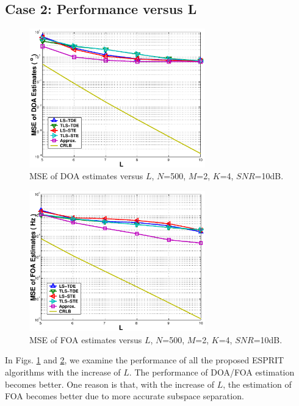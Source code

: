 \documentclass[a4paper,10pt,fleqn,twocolumn]{IEEEtran}
\begin{document}
\subsection*{Case 2: Performance versus L}
\begin{figure}
\begin{center}
\includegraphics[width=3in]{SF_DOAL.eps}
\caption{MSE of DOA estimates versus $L$, $N$=500, $M$=2, $K$=4,
$SNR$=10dB.} \label{SFDOAL}
\end{center}
\end{figure}
\begin{figure}
\begin{center}
\includegraphics[width=3in]{SF_FOAL.eps}
\caption{MSE of FOA estimates versus $L$, $N$=500, $M$=2, $K$=4,
$SNR$=10dB.} \label{SFFOAL}
\end{center}
\end{figure}

In Figs. \ref{SFDOAL} and \ref{SFFOAL}, we examine the performance
of all the proposed ESPRIT algorithms with the increase of $L$.
The performance of DOA/FOA estimation becomes better. One reason
is that, with the increase of $L$, the estimation of FOA becomes
better due to more accurate subspace separation.
\end{document}
